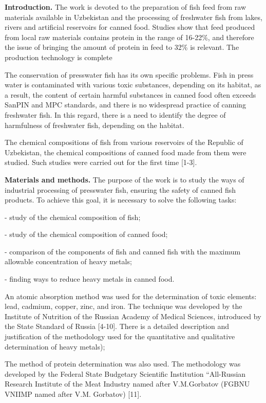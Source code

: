 \begin{multicols}{2}
{\bfseries Introduction.} The work is devoted to the preparation of fish
feed from raw materials available in Uzbekistan and the processing of
freshwater fish from lakes, rivers and artificial reservoirs for canned
food. Studies show that feed produced from local raw materials contains
protein in the range of 16-22\%, and therefore the issue of bringing the
amount of protein in feed to 32\% is relevant. The production technology
is complete

The conservation of presswater fish has its own specific problems. Fish
in press water is contaminated with various toxic substances, depending
on its habitat, as a result, the content of certain harmful substances
in canned food often exceeds SanPIN and MPC standards, and there is no
widespread practice of canning freshwater fish. In this regard, there is
a need to identify the degree of harmfulness of freshwater fish,
depending on the habitat.

The chemical compositions of fish from various reservoirs of the
Republic of Uzbekistan, the chemical compositions of canned food made
from them were studied. Such studies were carried out for the first time
{[}1-3{]}.

{\bfseries Materials and methods.} The purpose of the work is to study the
ways of industrial processing of presswater fish, ensuring the safety of
canned fish products. To achieve this goal, it is necessary to solve the
following tasks:

- study of the chemical composition of fish;

- study of the chemical composition of canned food;

- comparison of the components of fish and canned fish with the maximum
allowable concentration of heavy metals;

- finding ways to reduce heavy metals in canned food.

An atomic absorption method was used for the determination of toxic
elements: lead, cadmium, copper, zinc, and iron. The technique was
developed by the Institute of Nutrition of the Russian Academy of
Medical Sciences, introduced by the State Standard of Russia {[}4-10{]}.
There is a detailed description and justification of the methodology
used for the quantitative and qualitative determination of heavy
metals);

The method of protein determination was also used. The methodology was
developed by the Federal State Budgetary Scientific Institution
``All-Russian Research Institute of the Meat Industry named after
V.M.Gorbatov (FGBNU VNIIMP named after V.M. Gorbatov) {[}11{]}.


\end{multicols}
